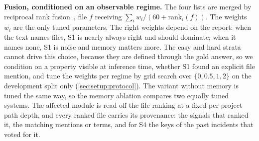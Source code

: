 \label{sec:approach:fusion}
\textbf{Fusion, conditioned on an observable regime.} The four lists
are merged by reciprocal rank fusion~\cite{cormack2009rrf}, file $f$ receiving
$\sum_i w_i / (60 + \mathrm{rank}_i(f))$. The weights $w_i$ are the only
tuned parameters. The right weights depend on the report: when the text
names files, S1 is nearly always right and should dominate; when it
names none, S1 is noise and memory matters more. The easy and hard
strata cannot drive this choice, because they are defined through the
gold answer, so we condition on a property visible at inference time,
whether S1 found an explicit file mention, and tune the weights per
regime by grid search over $\{0, 0.5, 1, 2\}$ on the development split
only (\cref{sec:setup:protocol}). The variant without memory is tuned
the same way, so the memory ablation compares two equally tuned
systems. The affected module is read off the file ranking at a fixed
per-project path depth, and every ranked file carries its provenance:
the signals that ranked it, the matching mentions or terms, and for S4
the keys of the past incidents that voted for it.
